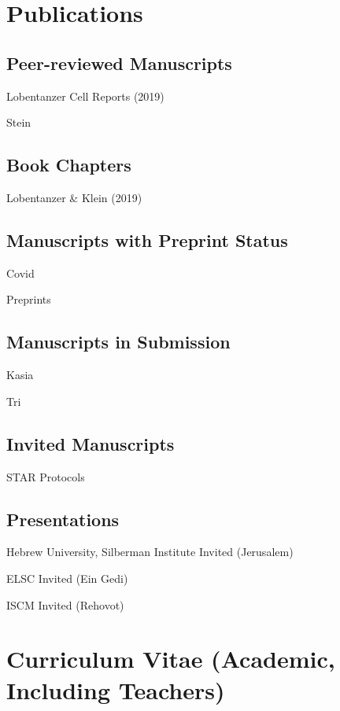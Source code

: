\newpage

\section{Publications}

\subsection{Peer-reviewed Manuscripts}
\noindent Lobentanzer Cell Reports (2019)

\noindent Stein

\subsection{Book Chapters}
\noindent Lobentanzer \& Klein (2019)

\subsection{Manuscripts with Preprint Status}
\noindent Covid

\noindent Preprints

\subsection{Manuscripts in Submission}
\noindent Kasia

\noindent Tri

\subsection{Invited Manuscripts}
\noindent STAR Protocols

\subsection{Presentations}
\noindent Hebrew University, Silberman Institute Invited (Jerusalem)

\noindent ELSC Invited (Ein Gedi)

\noindent ISCM Invited (Rehovot)

\newpage

\section{Curriculum Vitae (Academic, Including Teachers)}